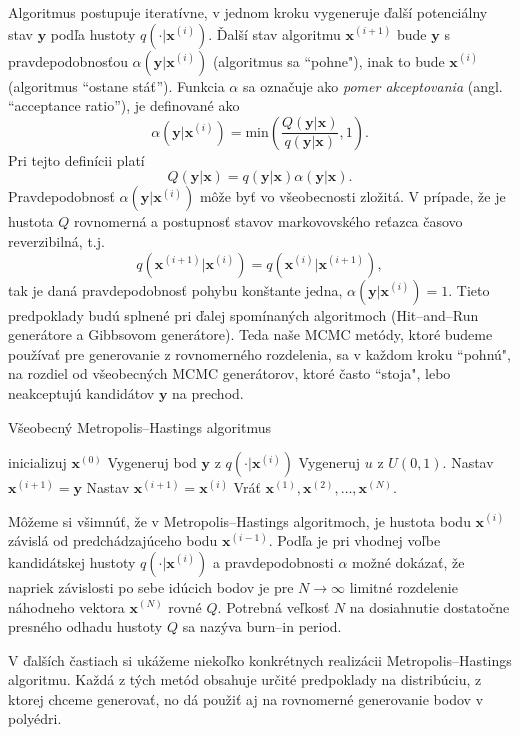 Algoritmus postupuje iteratívne, v jednom kroku vygeneruje ďalší potenciálny stav $\mathbf y$ podľa hustoty $q(\cdot |\mathbf x^{(i)})$. Ďalší stav algoritmu $\mathbf x^{(i+1)}$ bude $\mathbf y$ s pravdepodobnosťou $\alpha (\mathbf y|\mathbf x^{(i)})$ (algoritmus sa ``pohne"), inak to bude $\mathbf x^{(i)}$ (algoritmus ``ostane stáť''). Funkcia $\alpha$ sa označuje ako \textit{pomer akceptovania} (angl. ``acceptance ratio''), je definované ako $$\alpha (\mathbf y|\mathbf x^{(i)}) = \text{min}(\frac {Q(\mathbf y|\mathbf x)}{q(\mathbf y | \mathbf x)}, 1).$$ Pri tejto definícii platí $$Q(\mathbf y| \mathbf x)=q(\mathbf y | \mathbf x)\alpha(\mathbf y|\mathbf x).$$
Pravdepodobnosť $\alpha (\mathbf y|\mathbf x^{(i)})$ môže byť vo všeobecnosti zložitá. V prípade, že je hustota $Q$ rovnomerná a postupnosť stavov markovovského reťazca časovo reverzibilná, t.j. $$q(\mathbf x^{(i+1)}|\mathbf x^{(i)})=q(\mathbf x^{(i)}|\mathbf x^{(i+1)}),$$ tak je daná pravdepodobnosť pohybu konštante jedna, $\alpha (\mathbf y|\mathbf x^{(i)})=1$. Tieto predpoklady budú splnené pri ďalej spomínaných algoritmoch (Hit--and--Run generátore a Gibbsovom generátore). Teda naše MCMC metódy, ktoré budeme používať pre generovanie z rovnomerného rozdelenia, sa v každom kroku ``pohnú", na rozdiel od všeobecných MCMC generátorov, ktoré často ``stoja", lebo neakceptujú kandidátov $\mathbf y$ na prechod.

\begin{algorithm}[H]
	\caption{Všeobecný Metropolis--Hastings algoritmus \cite{metropolis-hastings_chib}}
	\label{metropolis-hastings}
	\begin{algorithmic}[1]
		\State inicializuj $\mathbf x^{(0)}$
			\State Vygeneruj bod $\mathbf y$ z $q(\cdot|\mathbf x^{(i)})$
			\State Vygeneruj $u$ z $U(0,1)$.
				\State Nastav $\mathbf x^{(i+1)}=\mathbf y$
			\Else
				\State Nastav $\mathbf x^{(i+1)}=\mathbf x^{(i)}$
			\EndIf
		\EndFor
		\State Vráť ${\mathbf x^{(1)},\mathbf x^{(2)},\dots,\mathbf x^{(N)}}$.
	\end{algorithmic}
\end{algorithm}

Môžeme si všimnúť, že v Metropolis--Hastings algoritmoch, je hustota bodu $\mathbf x^{(i)}$ závislá od predchádzajúceho bodu $\mathbf x^{(i-1)}$. Podľa \cite{metropolis-hastings_chib} je pri vhodnej voľbe kandidátskej hustoty $q(\cdot|\mathbf x^{(i)})$ a pravdepodobnosti $\alpha$ možné dokázať, že napriek závislosti po sebe idúcich bodov je pre $N \rightarrow \infty$ limitné rozdelenie náhodneho vektora $\mathbf x^{(N)}$ rovné $Q$. Potrebná veľkosť $N$ na dosiahnutie dostatočne presného odhadu hustoty $Q$ sa nazýva burn--in period.

V ďalších častiach si ukážeme niekoľko konkrétnych realizácii Metropolis--Hastings algoritmu. Každá z tých metód obsahuje určité predpoklady na distribúciu, z ktorej chceme generovať, no dá použiť aj na rovnomerné generovanie bodov v polyédri.